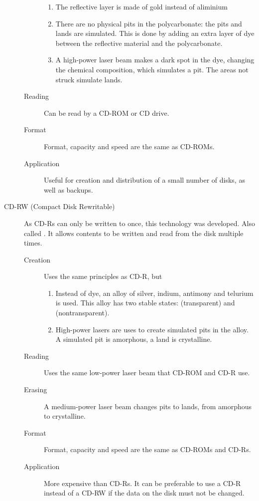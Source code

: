 \documentclass[\main/notes.tex]{subfiles}
\begin{document}
\begin{indentparagraph}
\begin{description}
\begin{description}
\begin{enumerate}[label=\alph*, nosep]
											\item The reflective layer is made of gold instead of aliminium
											\item There are no physical pits in the polycarbonate: the pits and lands are simulated. This is done by adding an extra layer of dye between the reflective material and the polycarbonate.
											\item A high-power laser beam makes a dark spot in the dye, changing the chemical composition, which simulates a pit. The areas not struck simulate lands.
										\end{enumerate} 
									\item[Reading] Can be read by a CD-ROM or CD drive.
									\item[Format] Format, capacity and speed are the same as CD-ROMs.
									\item[Application] Useful for creation and distribution of a small number of disks, as well as backups.
								\end{description}
							\item[CD-RW (Compact Disk Rewritable)] As CD-Rs can only be written to once, this technology was developed. Also called . It allows contents to be written and read from the disk multiple times.
								\begin{description}
									\item[Creation] Uses the same principles as CD-R, but
										\begin{enumerate}[label=\alph*, nosep]
											\item Instead of dye, an alloy of silver, indium, antimony and telurium is used. This alloy has two stable states:  (transparent) and  (nontransparent).
											\item High-power lasers are uses to create simulated pits in the alloy. A simulated pit is amorphous, a land is crystalline.
										\end{enumerate}
									\item[Reading] Uses the same low-power laser beam that CD-ROM and CD-R use.
									\item[Erasing] A medium-power laser beam changes pits to lands, from amorphous to crystalline.
									\item[Format] Format, capacity and speed are the same as CD-ROMs and CD-Rs.
									\item[Application] More expensive than CD-Rs. It can be preferable to use a CD-R instead of a CD-RW if the data on the disk must not be changed.

\end{description}
\end{description}
\end{indentparagraph}
\end{document}
